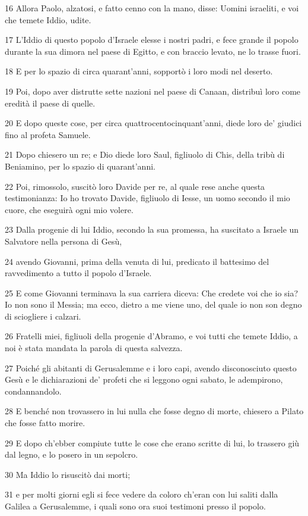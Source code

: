 \par 16 Allora Paolo, alzatosi, e fatto cenno con la mano, disse: Uomini israeliti, e voi che temete Iddio, udite.
\par 17 L'Iddio di questo popolo d'Israele elesse i nostri padri, e fece grande il popolo durante la sua dimora nel paese di Egitto, e con braccio levato, ne lo trasse fuori.
\par 18 E per lo spazio di circa quarant'anni, sopportò i loro modi nel deserto.
\par 19 Poi, dopo aver distrutte sette nazioni nel paese di Canaan, distribuì loro come eredità il paese di quelle.
\par 20 E dopo queste cose, per circa quattrocentocinquant'anni, diede loro de' giudici fino al profeta Samuele.
\par 21 Dopo chiesero un re; e Dio diede loro Saul, figliuolo di Chis, della tribù di Beniamino, per lo spazio di quarant'anni.
\par 22 Poi, rimossolo, suscitò loro Davide per re, al quale rese anche questa testimonianza: Io ho trovato Davide, figliuolo di Iesse, un uomo secondo il mio cuore, che eseguirà ogni mio volere.
\par 23 Dalla progenie di lui Iddio, secondo la sua promessa, ha suscitato a Israele un Salvatore nella persona di Gesù,
\par 24 avendo Giovanni, prima della venuta di lui, predicato il battesimo del ravvedimento a tutto il popolo d'Israele.
\par 25 E come Giovanni terminava la sua carriera diceva: Che credete voi che io sia? Io non sono il Messia; ma ecco, dietro a me viene uno, del quale io non son degno di sciogliere i calzari.
\par 26 Fratelli miei, figliuoli della progenie d'Abramo, e voi tutti che temete Iddio, a noi è stata mandata la parola di questa salvezza.
\par 27 Poiché gli abitanti di Gerusalemme e i loro capi, avendo disconosciuto questo Gesù e le dichiarazioni de' profeti che si leggono ogni sabato, le adempirono, condannandolo.
\par 28 E benché non trovassero in lui nulla che fosse degno di morte, chiesero a Pilato che fosse fatto morire.
\par 29 E dopo ch'ebber compiute tutte le cose che erano scritte di lui, lo trassero giù dal legno, e lo posero in un sepolcro.
\par 30 Ma Iddio lo risuscitò dai morti;
\par 31 e per molti giorni egli si fece vedere da coloro ch'eran con lui saliti dalla Galilea a Gerusalemme, i quali sono ora suoi testimoni presso il popolo.
